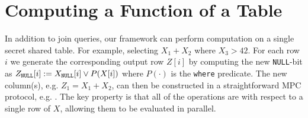

\section{Computing a Function of a Table}\label{sec:card}

In addition to join queries, our framework can perform computation on a single secret shared table. For example, selecting $X_1+X_2$  where $X_3>42$. For each row $i$ we generate the corresponding output row $Z[i]$ by computing the new \texttt{NULL}-bit as $Z_\texttt{NULL}[i] := X_\texttt{NULL}[i] \vee P(X[i])$ where $P(\cdot)$ is the \texttt{where} predicate. The new column(s), e.g. $Z_1=X_1+X_2$, can then be constructed in a straightforward MPC protocol, e.g. \cite{aby3,highthroughput}. The key property is that all of the operations are with respect to a single row of $X$, allowing them to be evaluated in parallel. 

